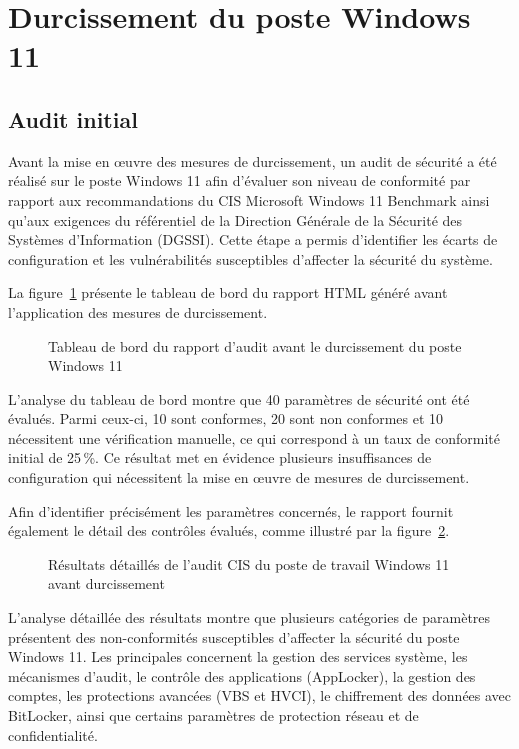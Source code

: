 \section{Durcissement du poste Windows 11}

\subsection{Audit initial}

Avant la mise en œuvre des mesures de durcissement, un audit de sécurité a été réalisé sur le poste Windows 11 afin d'évaluer son niveau de conformité par rapport aux recommandations du CIS Microsoft Windows 11 Benchmark ainsi qu'aux exigences du référentiel de la Direction Générale de la Sécurité des Systèmes d'Information (DGSSI). Cette étape a permis d'identifier les écarts de configuration et les vulnérabilités susceptibles d'affecter la sécurité du système.

La figure~\ref{fig:win-before-dash} présente le tableau de bord du rapport HTML généré avant l'application des mesures de durcissement.

\begin{figure}[htbp]
\centering
{}
\caption{Tableau de bord du rapport d'audit avant le durcissement du poste Windows 11}
\label{fig:win-before-dash}
\end{figure}

L'analyse du tableau de bord montre que 40 paramètres de sécurité ont été évalués. Parmi ceux-ci, 10 sont conformes, 20 sont non conformes et 10 nécessitent une vérification manuelle, ce qui correspond à un taux de conformité initial de 25\,\%. Ce résultat met en évidence plusieurs insuffisances de configuration qui nécessitent la mise en œuvre de mesures de durcissement.

Afin d'identifier précisément les paramètres concernés, le rapport fournit également le détail des contrôles évalués, comme illustré par la figure~\ref{fig:win-before-detail}.

\begin{figure}[htbp]
\centering
{}
\caption{Résultats détaillés de l'audit CIS du poste de travail Windows 11 avant durcissement}
\label{fig:win-before-detail}
\end{figure}

L'analyse détaillée des résultats montre que plusieurs catégories de paramètres présentent des non-conformités susceptibles d'affecter la sécurité du poste Windows 11. Les principales concernent la gestion des services système, les mécanismes d'audit, le contrôle des applications (AppLocker), la gestion des comptes, les protections avancées (VBS et HVCI), le chiffrement des données avec BitLocker, ainsi que certains paramètres de protection réseau et de confidentialité.

